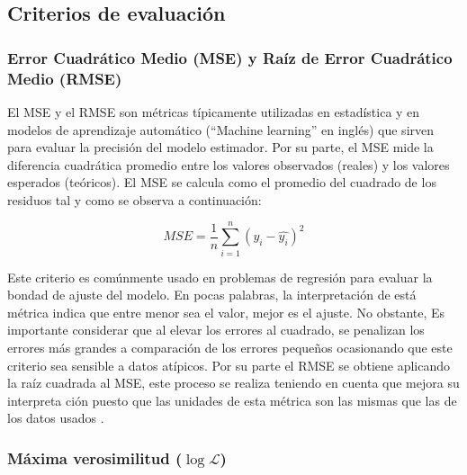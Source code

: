 \subsection{Criterios de evaluación}
\subsubsection{Error Cuadrático Medio (MSE) y Raíz de Error Cuadrático Medio (RMSE)}
El MSE y el RMSE son métricas típicamente utilizadas en estadística y en modelos de aprendizaje automático (``Machine learning'' en inglés) que sirven para evaluar la precisión del modelo estimador. Por su parte, el MSE mide la diferencia cuadrática promedio entre los valores observados (reales) y los valores esperados (teóricos). El MSE se calcula como el promedio del cuadrado de  los residuos tal y como se observa a continuación:

\begin{equation}
    MSE = \frac{1}{n} \sum_{i=1}^{n}(y_{i}-\hat{y_{i}})^{2}
\end{equation}

Este criterio es comúnmente usado en problemas de regresión para evaluar la bondad de ajuste del modelo. En pocas palabras, la interpretación de está métrica indica que entre menor sea el valor, mejor es el ajuste. No obstante, Es importante considerar que al elevar los errores al cuadrado, se penalizan los errores más grandes a comparación de los errores pequeños ocasionando que este criterio sea sensible a datos atípicos. Por su parte el RMSE se obtiene aplicando la raíz  cuadrada al MSE, este proceso se realiza teniendo en cuenta que mejora su interpreta ción puesto que las unidades de esta métrica son las mismas que las de los datos usados \cite{msereg}.

\subsubsection{Máxima verosimilitud ($\log \mathcal{L}$)}

